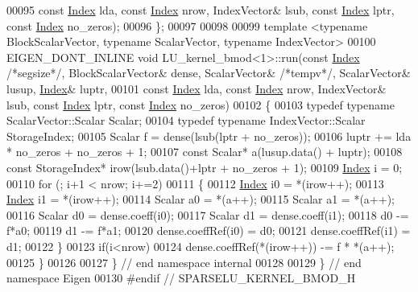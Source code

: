 \begin{DoxyCode}
00095                                     \textcolor{keyword}{const} \hyperlink{namespace_eigen_a62e77e0933482dafde8fe197d9a2cfde}{Index} lda, \textcolor{keyword}{const} \hyperlink{namespace_eigen_a62e77e0933482dafde8fe197d9a2cfde}{Index} nrow, IndexVector& lsub, \textcolor{keyword}{const} 
      \hyperlink{namespace_eigen_a62e77e0933482dafde8fe197d9a2cfde}{Index} lptr, \textcolor{keyword}{const} \hyperlink{namespace_eigen_a62e77e0933482dafde8fe197d9a2cfde}{Index} no\_zeros);
00096 \};
00097 
00098 
00099 \textcolor{keyword}{template} <\textcolor{keyword}{typename} BlockScalarVector, \textcolor{keyword}{typename} ScalarVector, \textcolor{keyword}{typename} IndexVector>
00100 EIGEN\_DONT\_INLINE \textcolor{keywordtype}{void} LU\_kernel\_bmod<1>::run(\textcolor{keyword}{const} \hyperlink{namespace_eigen_a62e77e0933482dafde8fe197d9a2cfde}{Index} \textcolor{comment}{/*segsize*/}, BlockScalarVector& dense, 
      ScalarVector& \textcolor{comment}{/*tempv*/}, ScalarVector& lusup, \hyperlink{namespace_eigen_a62e77e0933482dafde8fe197d9a2cfde}{Index}& luptr,
00101                                               \textcolor{keyword}{const} \hyperlink{namespace_eigen_a62e77e0933482dafde8fe197d9a2cfde}{Index} lda, \textcolor{keyword}{const} \hyperlink{namespace_eigen_a62e77e0933482dafde8fe197d9a2cfde}{Index} nrow, IndexVector& 
      lsub, \textcolor{keyword}{const} \hyperlink{namespace_eigen_a62e77e0933482dafde8fe197d9a2cfde}{Index} lptr, \textcolor{keyword}{const} \hyperlink{namespace_eigen_a62e77e0933482dafde8fe197d9a2cfde}{Index} no\_zeros)
00102 \{
00103   \textcolor{keyword}{typedef} \textcolor{keyword}{typename} ScalarVector::Scalar Scalar;
00104   \textcolor{keyword}{typedef} \textcolor{keyword}{typename} IndexVector::Scalar StorageIndex;
00105   Scalar f = dense(lsub(lptr + no\_zeros));
00106   luptr += lda * no\_zeros + no\_zeros + 1;
00107   \textcolor{keyword}{const} Scalar* a(lusup.data() + luptr);
00108   \textcolor{keyword}{const} StorageIndex*  irow(lsub.data()+lptr + no\_zeros + 1);
00109   \hyperlink{namespace_eigen_a62e77e0933482dafde8fe197d9a2cfde}{Index} i = 0;
00110   \textcolor{keywordflow}{for} (; i+1 < nrow; i+=2)
00111   \{
00112     \hyperlink{namespace_eigen_a62e77e0933482dafde8fe197d9a2cfde}{Index} i0 = *(irow++);
00113     \hyperlink{namespace_eigen_a62e77e0933482dafde8fe197d9a2cfde}{Index} i1 = *(irow++);
00114     Scalar a0 = *(a++);
00115     Scalar a1 = *(a++);
00116     Scalar d0 = dense.coeff(i0);
00117     Scalar d1 = dense.coeff(i1);
00118     d0 -= f*a0;
00119     d1 -= f*a1;
00120     dense.coeffRef(i0) = d0;
00121     dense.coeffRef(i1) = d1;
00122   \}
00123   \textcolor{keywordflow}{if}(i<nrow)
00124     dense.coeffRef(*(irow++)) -= f * *(a++);
00125 \}
00126 
00127 \} \textcolor{comment}{// end namespace internal}
00128 
00129 \} \textcolor{comment}{// end namespace Eigen}
00130 \textcolor{preprocessor}{#endif // SPARSELU\_KERNEL\_BMOD\_H}
\end{DoxyCode}
